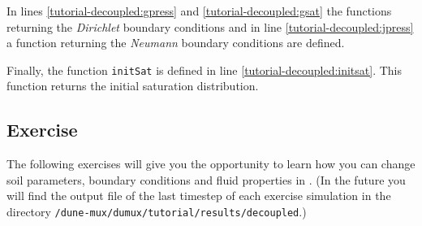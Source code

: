 In lines \ref{tutorial-decoupled:gpress} and \ref{tutorial-decoupled:gsat} the functions returning the \textit{Dirichlet} boundary conditions and in line \ref{tutorial-decoupled:jpress} a function returning the \textit{Neumann} boundary conditions are defined.

Finally, the function \texttt{initSat} is defined in line \ref{tutorial-decoupled:initsat}. This function returns the initial saturation distribution.

\subsection{Exercise}
\label{tutorial-deoucpled:exercises}
The following exercises will give you the opportunity to learn how you can change soil parameters, boundary conditions and fluid properties in \Dumux. (In the future you will find the output file of the last timestep of each exercise simulation in the directory \texttt{/dune-mux/dumux/tutorial/results/decoupled}.)

